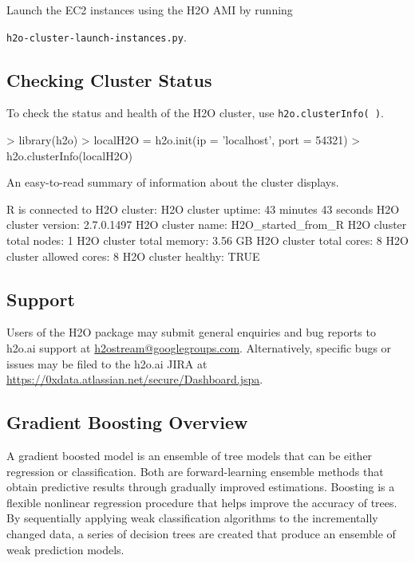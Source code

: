 \documentclass[11pt]{article}
\begin{document}
Launch the EC2 instances using the H2O AMI by running {\texttt{h2o-cluster-launch-instances.py}.


\subsection{Checking Cluster Status}


To check the status and health of the H2O cluster, use {\texttt{h2o.clusterInfo( )}}.
\begin{spverbatim}
> library(h2o)
> localH2O = h2o.init(ip = 'localhost', port = 54321)
> h2o.clusterInfo(localH2O)
\end{spverbatim}

An easy-to-read summary of information about the cluster displays. 
\begin{spverbatim}
R is connected to H2O cluster:
  H2O cluster uptime:         43 minutes 43 seconds
  H2O cluster version:        2.7.0.1497
  H2O cluster name:           H2O_started_from_R
  H2O cluster total nodes:    1
  H2O cluster total memory:   3.56 GB
  H2O cluster total cores:    8
  H2O cluster allowed cores:  8
  H2O cluster healthy:        TRUE
\end{spverbatim}

\noindent

\subsection{Support} 
Users of the H2O package may submit general enquiries and bug reports to h2o.ai support at {\url{h2ostream@googlegroups.com}}. Alternatively, specific bugs or issues may be filed to the h2o.ai JIRA at {\url{https://0xdata.atlassian.net/secure/Dashboard.jspa}}.

\subsection{Gradient Boosting Overview} 

A gradient boosted model is an ensemble of tree models that can be either regression or classification. Both are forward-learning ensemble methods that obtain predictive results through gradually improved estimations. Boosting is a flexible nonlinear regression procedure that helps improve the accuracy of trees. By sequentially applying weak classification algorithms to the incrementally changed data, a series of decision trees are created that produce an ensemble of weak prediction models.

}
\end{document}
